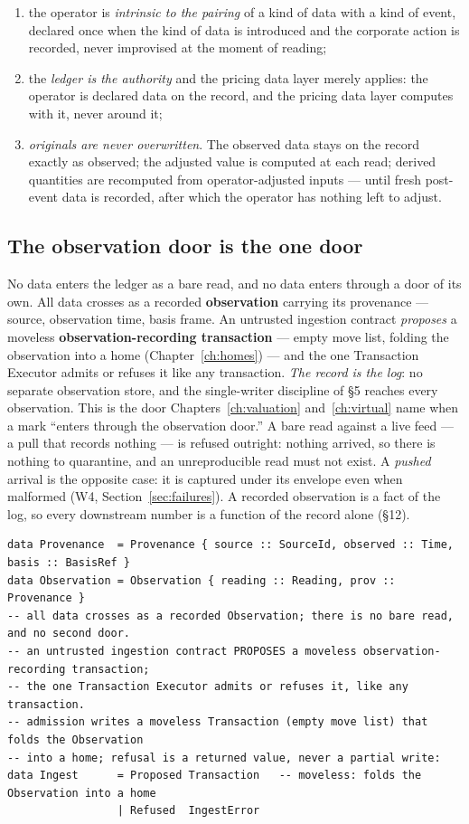 \documentclass[11pt,a4paper]{article}
\begin{document}
\begin{enumerate}[label=(\roman*),nosep,leftmargin=2.2em]
\item the operator is \emph{intrinsic to the pairing} of a kind of data with a kind of
  event, declared once when the kind of data is introduced and the corporate action is
  recorded, never improvised at the moment of reading;
\item the \emph{ledger is the authority} and the pricing data layer merely applies: the
  operator is declared data on the record, and the pricing data layer computes with it,
  never around it;
\item \emph{originals are never overwritten}. The observed data stays on the record
  exactly as observed; the adjusted value is computed at each read; derived quantities are
  recomputed from operator-adjusted inputs --- until fresh post-event data is recorded,
  after which the operator has nothing left to adjust.
\end{enumerate}

\subsection{The observation door is the one door}\label{sec:obs-door}

No data enters the ledger as a bare read, and no data enters through a door of its own.
All data crosses as a recorded \textbf{observation} carrying its provenance --- source,
observation time, basis frame. An untrusted ingestion contract \emph{proposes} a moveless
\textbf{observation-recording transaction} --- empty move list, folding the observation
into a home (Chapter~\ref{ch:homes}) --- and the one Transaction Executor admits or
refuses it like any transaction. \emph{The record is the log}: no separate observation
store, and the single-writer discipline of \S5 reaches every observation. This is the door
Chapters~\ref{ch:valuation} and~\ref{ch:virtual} name when a mark ``enters through the
observation door.'' A bare read against a live feed --- a pull that records nothing ---
is refused outright: nothing arrived, so there is nothing to quarantine, and an
unreproducible read must not exist. A \emph{pushed} arrival is the opposite case: it is
captured under its envelope even when malformed (W4, Section~\ref{sec:failures}). A
recorded observation is a fact of the log, so every downstream number is a function of
the record alone (\S 12).

\begin{lstlisting}
data Provenance  = Provenance { source :: SourceId, observed :: Time, basis :: BasisRef }
data Observation = Observation { reading :: Reading, prov :: Provenance }
-- all data crosses as a recorded Observation; there is no bare read, and no second door.
-- an untrusted ingestion contract PROPOSES a moveless observation-recording transaction;
-- the one Transaction Executor admits or refuses it, like any transaction.
-- admission writes a moveless Transaction (empty move list) that folds the Observation
-- into a home; refusal is a returned value, never a partial write:
data Ingest      = Proposed Transaction   -- moveless: folds the Observation into a home
                 | Refused  IngestError
\end{lstlisting}
\end{document}
